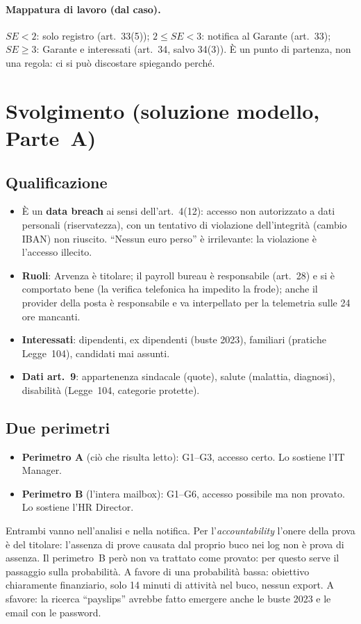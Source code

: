 \paragraph{Mappatura di lavoro (dal caso).} $SE<2$: solo registro (art.~33(5)); $2 \le SE <3$:
notifica al Garante (art.~33); $SE \ge 3$: Garante e interessati (art.~34, salvo 34(3)). È un punto
di partenza, non una regola: ci si può discostare spiegando perché.

\section{Svolgimento (soluzione modello, Parte~A)}

\subsection{Qualificazione}
\begin{itemize}
  \item È un \textbf{data breach} ai sensi dell'art.~4(12): accesso non autorizzato a dati personali
    (riservatezza), con un tentativo di violazione dell'integrità (cambio IBAN) non riuscito. ``Nessun
    euro perso'' è irrilevante: la violazione è l'accesso illecito.
  \item \textbf{Ruoli}: Arvenza è titolare; il payroll bureau è responsabile (art.~28) e si è comportato
    bene (la verifica telefonica ha impedito la frode); anche il provider della posta è responsabile e
    va interpellato per la telemetria sulle 24 ore mancanti.
  \item \textbf{Interessati}: dipendenti, ex dipendenti (buste 2023), familiari (pratiche Legge~104),
    candidati mai assunti.
  \item \textbf{Dati art.~9}: appartenenza sindacale (quote), salute (malattia, diagnosi), disabilità
    (Legge~104, categorie protette).
\end{itemize}

\subsection{Due perimetri}
\begin{itemize}
  \item \textbf{Perimetro A} (ciò che risulta letto): G1--G3, accesso certo. Lo sostiene l'IT Manager.
  \item \textbf{Perimetro B} (l'intera mailbox): G1--G6, accesso possibile ma non provato. Lo sostiene
    l'HR Director.
\end{itemize}
Entrambi vanno nell'analisi e nella notifica. Per l'\emph{accountability} l'onere della prova è del
titolare: l'assenza di prove causata dal proprio buco nei log non è prova di assenza. Il perimetro~B
però non va trattato come provato: per questo serve il passaggio sulla probabilità. A favore di una
probabilità bassa: obiettivo chiaramente finanziario, solo 14 minuti di attività nel buco, nessun
export. A sfavore: la ricerca ``payslips'' avrebbe fatto emergere anche le buste 2023 e le email con
le password.


